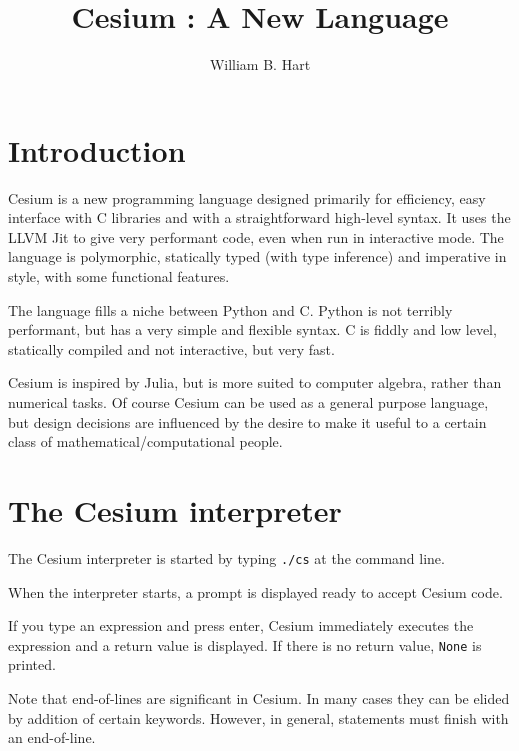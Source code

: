 \documentclass[a4paper,10pt]{article}
\title{Cesium : A New Language}
\author{William B. Hart}
\newcommand{\code}{\lstinline}
\begin{document}
\maketitle
\tableofcontents

\section{Introduction}

Cesium is a new programming language designed primarily for efficiency, easy interface with C libraries
and with a straightforward high-level syntax. It uses the LLVM Jit to give very performant code, even
when run in interactive mode. The language is polymorphic, statically typed (with type inference) and
imperative in style, with some functional features.

The language fills a niche between Python and C. Python is not terribly performant, but has a very
simple and flexible syntax. C is fiddly and low level, statically compiled and not interactive, but very 
fast. 

Cesium is inspired by Julia, but is more suited to computer algebra, rather than numerical tasks.
Of course Cesium can be used as a general purpose language, but design decisions are influenced by the
desire to make it useful to a certain class of mathematical/computational people.

\section{The Cesium interpreter}

The Cesium interpreter is started by typing \code{./cs} at the command line.

When the interpreter starts, a prompt is displayed ready to accept Cesium code.

If you type an expression and press enter, Cesium immediately executes the expression and a return 
value is displayed. If there is no return value, \code{None} is printed.

Note that end-of-lines are significant in Cesium. In many cases they can be elided by addition of
certain keywords. However, in general, statements must finish with an end-of-line.
\end{document}

